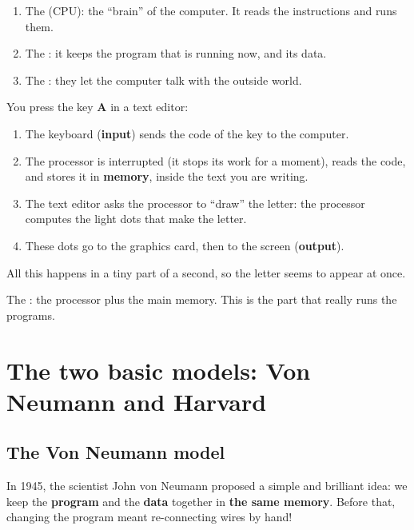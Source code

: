 \begin{enumerate}
    \item The  (CPU): the ``brain'' of the computer. It reads the instructions and runs them.
    \item The : it keeps the program that is running now, and its data.
    \item The : they let the computer talk with the outside world.
\end{enumerate}

\begin{khatwa}
    You press the key \textbf{A} in a text editor:
    \begin{enumerate}
        \item The keyboard (\textbf{input}) sends the code of the key to the computer.
        \item The processor is interrupted (it stops its work for a moment), reads the code, and stores it in
              \textbf{memory}, inside the text you are writing.
        \item The text editor asks the processor to ``draw'' the letter: the processor computes the light dots that make the letter.
        \item These dots go to the graphics card, then to the screen (\textbf{output}).
    \end{enumerate}
    All this happens in a tiny part of a second, so the letter seems to appear at once.
\end{khatwa}

\begin{tarif}
    The : the processor plus the main memory. This is the part that really runs the programs.
\end{tarif}

\section{The two basic models: Von Neumann and Harvard}

\subsection{The Von Neumann model}

In 1945, the scientist John von Neumann proposed a simple and brilliant idea: we keep the
\textbf{program} and the \textbf{data} together in \textbf{the same memory}. Before that, changing the
program meant re-connecting wires by hand!

